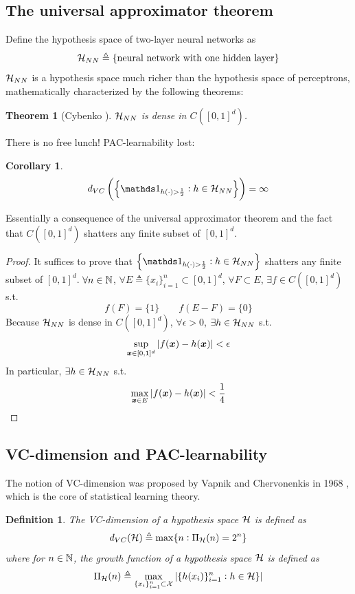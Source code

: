 \documentclass{article}
\newcommand{\ind}{{\mathds 1}}
\newtheorem{definition}{Definition}
\newtheorem{corollary}{Corollary}
\newtheorem{theorem}{Theorem}
\begin{document}
\subsection{The universal approximator theorem}

Define the hypothesis space of two-layer neural networks as
\[
{\mathcal H}_{NN} \triangleq \{\text{neural network with one hidden layer}\}
\]
${\mathcal H}_{NN}$ is a hypothesis space much richer than the hypothesis space of perceptrons, mathematically characterized by the following theorems:
\begin{theorem}[Cybenko \cite{cybenko1989approximation}]
${\mathcal H}_{NN}$ is dense in $C ([0, 1]^d)$.
\end{theorem}

There is no free lunch!
PAC-learnability lost:
\begin{corollary}
\[
d_{VC} \left(\left\{\ind_{h(\cdot) > \frac12} : h \in \calh_{NN}\right\}\right) = \infty
\]
\end{corollary}
Essentially a consequence of the universal approximator theorem and the fact that $C ([0, 1]^d)$ shatters any finite subset of $[0, 1]^d$.

\begin{proof}
It suffices to prove that $\left\{\ind_{h(\cdot) > \frac12} : h \in \calh_{NN}\right\}$ shatters any finite subset of $[0, 1]^d$.
$\forall n \in {\mathbb N}$, $\forall E \triangleq \{x_i\}_{i = 1}^n \subset [0, 1]^d$, $\forall F \subset E$, $\exists f \in C([0, 1]^d)$ s.t.
\[
f(F) = \{1\} \qquad f(E - F) = \{0\}
\]
Because ${\mathcal H}_{NN}$ is dense in $C([0, 1]^d)$, $\forall \epsilon > 0$, $\exists h \in {\mathcal H}_{NN}$ s.t.
\[
\sup_{{\bm x} \in [0, 1]^d} |f({\bm x}) - h({\bm x})| < \epsilon
\]
In particular, $\exists h \in {\mathcal H}_{NN}$ s.t.
\[
\max_{{\bm x} \in E} |f({\bm x}) - h({\bm x})| < \frac14
\]
\end{proof}

\subsection{VC-dimension and PAC-learnability}

The notion of VC-dimension was proposed by Vapnik and Chervonenkis in 1968 \cite{vapnik2015uniform}, which is the core of statistical learning theory.
\begin{definition}
The \emph{VC-dimension} of a hypothesis space ${\mathcal H}$ is defined as
\[
d_{VC} ({\mathcal H}) \triangleq \max \{n : \Pi_{\mathcal H} (n) = 2^n\}
\]
where for $n \in {\mathbb N}$, the growth function of a hypothesis space ${\mathcal H}$ is defined as
\[
\Pi_{\mathcal H} (n) \triangleq \max_{\{x_i\}_{i = 1}^n \subset {\mathcal X}} |\{h(x_i)\}_{i = 1}^n : h \in {\mathcal H}\}|
\]
\end{definition}
\end{document}
